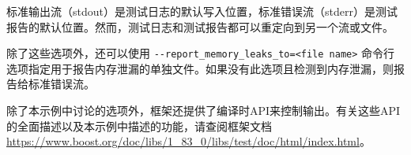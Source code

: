 标准输出流（stdout）是测试日志的默认写入位置，标准错误流（stderr）是测试报告的默认位置。然而，测试日志和测试报告都可以重定向到另一个流或文件。

除了这些选项外，还可以使用 \verb|--report_memory_leaks_to=<file name>| 命令行选项指定用于报告内存泄漏的单独文件。如果没有此选项且检测到内存泄漏，则报告给标准错误流。


除了本示例中讨论的选项外，框架还提供了编译时API来控制输出。有关这些API的全面描述以及本示例中描述的功能，请查阅框架文档 \url{https://www.boost.org/doc/libs/1_83_0/libs/test/doc/html/index.html}。


